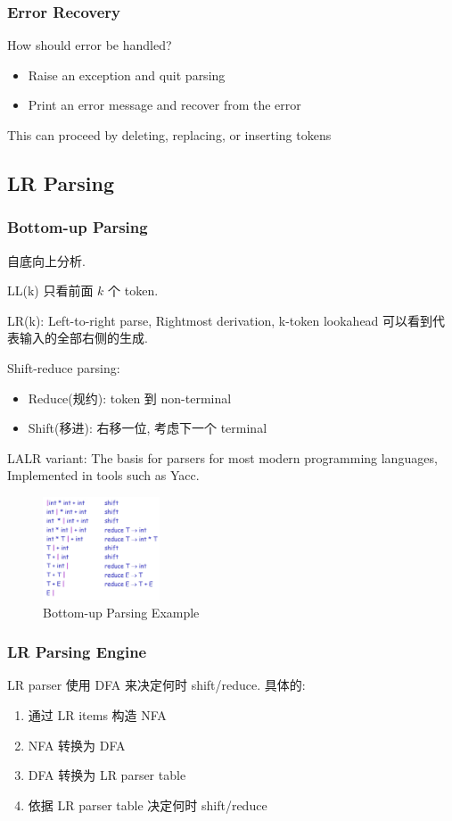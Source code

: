 \subsubsection{Error Recovery}
How should error be handled?
\begin{itemize}
    \item Raise an exception and quit parsing
    \item Print an error message and recover from the error
\end{itemize}
This can proceed by deleting, replacing, or inserting tokens

\subsection{LR Parsing}
\subsubsection{Bottom-up Parsing}
自底向上分析.

LL(k) 只看前面 $k$ 个 token.

LR(k): Left-to-right parse, Rightmost derivation, k-token lookahead 可以看到代表输入的全部右侧的生成.

Shift-reduce parsing:
\begin{itemize}
    \item Reduce(规约): token 到 non-terminal
    \item Shift(移进): 右移一位, 考虑下一个 terminal
\end{itemize}

LALR variant: The basis for parsers for most modern programming languages, Implemented in tools such as Yacc.

\begin{figure}[!htb]
    \centering
    \includegraphics[width=0.309\textwidth]{pic/CP3/lrexp.png}
    \caption{Bottom-up Parsing Example}
\end{figure}

\subsubsection{LR Parsing Engine}
LR parser 使用 DFA 来决定何时 shift/reduce. 具体的:
\begin{enumerate}
    \item 通过 LR items 构造 NFA
    \item NFA 转换为 DFA
    \item DFA 转换为 LR parser table
    \item 依据 LR parser table 决定何时 shift/reduce
\end{enumerate}


